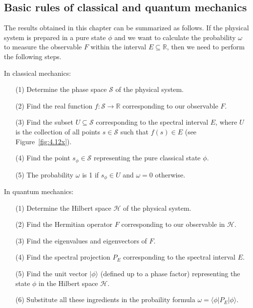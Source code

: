 \documentclass[nochecklpage]{stefan1}
\theoremstyle{definition}
\begin{document}
\subsection{Basic rules of classical and quantum mechanics}\label{ss:rules}
The results obtained in this chapter can be summarized as follows. If
the physical system is prepared in a pure state $ \phi $ and we want to
calculate the probability $ \omega $ to measure the observable $ F $
within the interval $ E \subseteq \mathbb{R} $, then we need to perform
the following steps.

\bigskip
\noindent
{In classical mechanics:}
%
%
\begin{enumerate}
\item[(1)] Determine the phase space $ \mathcal{S} $ of the physical
system.
\item[(2)] Find the real function $ f: \mathcal{S} \to \mathbb{R} $
corresponding to our observable $ F $.
\item[(3)] Find the subset $ U \subseteq \mathcal{S} $ corresponding to
the spectral interval $ E $, where $ U $ is the collection of all points
$ s \in \mathcal{S} $ such that $ f(s) \in E $ (see Figure~\ref{fig:4.12x}).
\item[(4)] Find the point $ s_{\phi } \in \mathcal{S} $ representing the
pure classical state $ \phi $.
\item[(5)] The probability $ \omega $ is 1 if $ s_{\phi } \in U $ and
$ \omega = 0 $ otherwise.
\end{enumerate}
%
%
{In quantum mechanics:}
%
%
\begin{enumerate}
\item[(1)] Determine the Hilbert space $ \mathscr{H} $ of the physical
system.
\item[(2)] Find the Hermitian operator $ F $ corresponding to our
observable in $ \mathscr{H} $.
\item[(3)] Find the eigenvalues and eigenvectors of $ F $.
\item[(4)] Find the spectral projection $ P_{E} $ corresponding to the
spectral interval $ E $.
\item[(5)] Find the unit vector $ | \phi \rangle $ (defined up to a phase
factor) representing the state $ \phi $ in the Hilbert space
$ \mathscr{H} $.
\item[(6)] Substitute all these ingredients in the probaility formula $ \omega =
\langle \phi | P_{E} | \phi \rangle $.
\end{enumerate}
\end{document}
